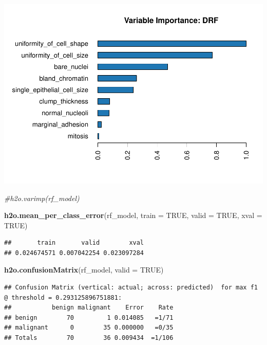 \documentclass[]{article}
\newenvironment{Shaded}{\begin{snugshade}}{\end{snugshade}}
\newcommand{\KeywordTok}[1]{\textcolor[rgb]{0.13,0.29,0.53}{\textbf{{#1}}}}
\newcommand{\DataTypeTok}[1]{\textcolor[rgb]{0.13,0.29,0.53}{{#1}}}
\newcommand{\CommentTok}[1]{\textcolor[rgb]{0.56,0.35,0.01}{\textit{{#1}}}}
\newcommand{\OtherTok}[1]{\textcolor[rgb]{0.56,0.35,0.01}{{#1}}}
\newcommand{\NormalTok}[1]{{#1}}
\begin{document}
\includegraphics{webinar_code_files/figure-latex/unnamed-chunk-50-1.pdf}

\begin{Shaded}
\begin{Highlighting}[]
\CommentTok{#h2o.varimp(rf_model)}
\end{Highlighting}
\end{Shaded}

\begin{Shaded}
\begin{Highlighting}[]
\KeywordTok{h2o.mean_per_class_error}\NormalTok{(rf_model, }\DataTypeTok{train =} \OtherTok{TRUE}\NormalTok{, }\DataTypeTok{valid =} \OtherTok{TRUE}\NormalTok{, }\DataTypeTok{xval =} \OtherTok{TRUE}\NormalTok{)}
\end{Highlighting}
\end{Shaded}

\begin{verbatim}
##       train       valid        xval 
## 0.024674571 0.007042254 0.023097284
\end{verbatim}

\begin{Shaded}
\begin{Highlighting}[]
\KeywordTok{h2o.confusionMatrix}\NormalTok{(rf_model, }\DataTypeTok{valid =} \OtherTok{TRUE}\NormalTok{)}
\end{Highlighting}
\end{Shaded}

\begin{verbatim}
## Confusion Matrix (vertical: actual; across: predicted)  for max f1 @ threshold = 0.293125896751881:
##           benign malignant    Error    Rate
## benign        70         1 0.014085   =1/71
## malignant      0        35 0.000000   =0/35
## Totals        70        36 0.009434  =1/106
\end{verbatim}
\end{document}
